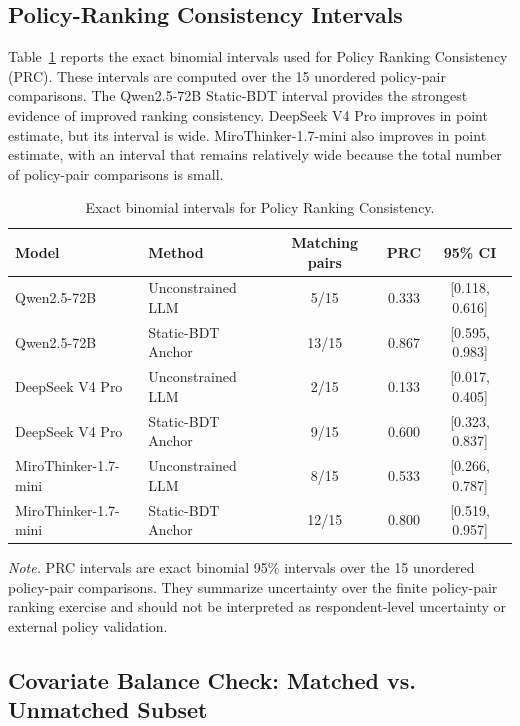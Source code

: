 \documentclass[11pt]{article}
\begin{document}
\subsection{Policy-Ranking Consistency Intervals}

Table~\ref{tab:bootstrap_prc} reports the exact binomial intervals used for Policy Ranking Consistency (PRC). These intervals are computed over the 15 unordered policy-pair comparisons. The Qwen2.5-72B Static-BDT interval provides the strongest evidence of improved ranking consistency. DeepSeek V4 Pro improves in point estimate, but its interval is wide. MiroThinker-1.7-mini also improves in point estimate, with an interval that remains relatively wide because the total number of policy-pair comparisons is small.

\begin{table}[t]
\centering
\caption{Exact binomial intervals for Policy Ranking Consistency.}
\label{tab:bootstrap_prc}
\small
\setlength{\tabcolsep}{6pt}
\begin{tabular}{l l c c c}
\toprule
Model & Method & Matching pairs & PRC & 95\% CI \\
\midrule
Qwen2.5-72B & Unconstrained LLM & 5/15 & 0.333 & [0.118, 0.616] \\
Qwen2.5-72B & Static-BDT Anchor & 13/15 & 0.867 & [0.595, 0.983] \\
\midrule
DeepSeek V4 Pro & Unconstrained LLM & 2/15 & 0.133 & [0.017, 0.405] \\
DeepSeek V4 Pro & Static-BDT Anchor & 9/15 & 0.600 & [0.323, 0.837] \\
\midrule
MiroThinker-1.7-mini & Unconstrained LLM & 8/15 & 0.533 & [0.266, 0.787] \\
MiroThinker-1.7-mini & Static-BDT Anchor & 12/15 & 0.800 & [0.519, 0.957] \\
\bottomrule
\end{tabular}

\vspace{0.4em}
\begin{minipage}{0.95\textwidth}
\small
\textit{Note.} PRC intervals are exact binomial 95\% intervals over the 15 unordered policy-pair comparisons. They summarize uncertainty over the finite policy-pair ranking exercise and should not be interpreted as respondent-level uncertainty or external policy validation.
\end{minipage}
\end{table}

\subsection{Covariate Balance Check: Matched vs. Unmatched Subset}
\label{app:balance_check}
\end{document}
